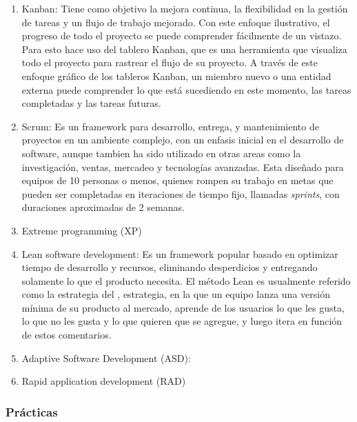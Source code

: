     \begin{enumerate}
        \item Kanban: Tiene como objetivo la mejora continua, la flexibilidad en la gestión de tareas y un flujo de trabajo mejorado. Con este enfoque ilustrativo, el progreso de todo el proyecto se puede comprender fácilmente de un vistazo. Para esto hace uso del tablero Kanban, que es una herramienta que visualiza todo el proyecto para rastrear el flujo de su proyecto. A través de este enfoque gráfico de los tableros Kanban, un miembro nuevo o una entidad externa puede comprender lo que está sucediendo en este momento, las tareas completadas y las tareas futuras.
        \item Scrum: Es un framework para desarrollo, entrega, y mantenimiento de proyectos en un ambiente complejo, con un enfasis inicial en el desarrollo de software, aunque tambien ha sido utilizado en otras areas como la investigación, ventas, mercadeo y tecnologías avanzadas. Esta diseñado para equipos de 10 personas o menos, quienes rompen su trabajo en metas que pueden ser completadas en iteraciones de tiempo fijo, llamadas \emph{sprints}, con duraciones aproximadas de 2 semanas. 
        \item Extreme programming (XP)
        \item Lean software development: Es un framework popular basado en optimizar tiempo de desarrollo y recursos, eliminando desperdicios y entregando solamente lo que el producto necesita. El método Lean es usualmente referido como la estrategia del , 
        estrategia, en la que un equipo lanza una versión mínima de su producto al mercado, aprende de los usuarios lo que les gusta, lo que no les gusta y lo que quieren que se agregue, y luego itera en función de estos comentarios.
        \item Adaptive Software Development (ASD):
        \item Rapid application development (RAD)
    \end{enumerate}

    \subsubsection{Prácticas}

